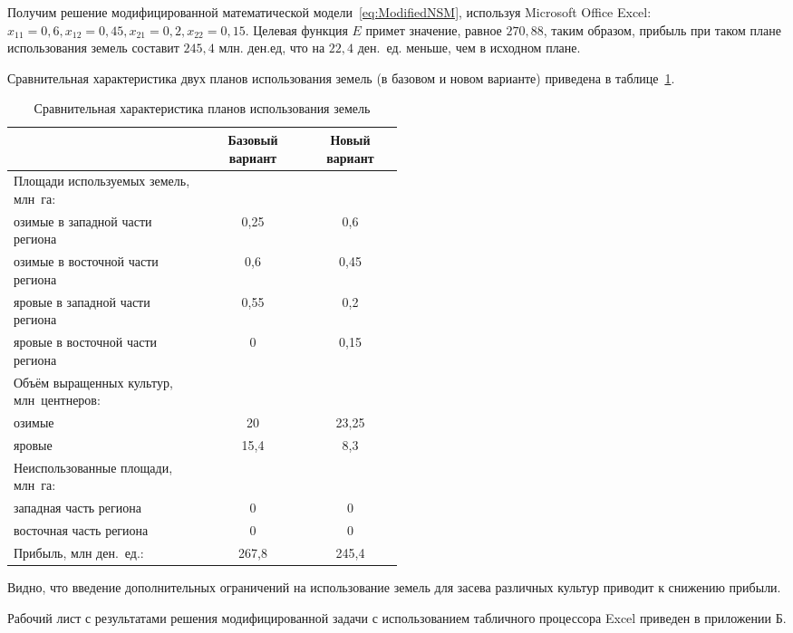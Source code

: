 Получим решение модифицированной математической модели~\eqref{eq:ModifiedNSM}, используя Microsoft Office Excel:
$ x_{11} = 0{,}6, x_{12} = 0{,}45, x_{21} = 0,2, x_{22} = 0{,}15 $. Целевая функция $ E $ примет значение,
равное $ 270{,}88 $, таким образом, прибыль при таком плане использования земель составит $ 245{,}4 $ млн. ден.ед,
что на $ 22{,}4 $ ден.~ед. меньше, чем в исходном плане.

Сравнительная характеристика двух планов использования земель (в базовом и новом варианте) приведена
в таблице~\ref{tbl:Comparation}.

\renewcommand{\tabcolsep}{0.3em}
\begin{table}[h!]
  \centering
    \caption{Сравнительная характеристика планов использования земель\label{tbl:Comparation}}
    \begin{tabular}{|p{0.5\linewidth}|c|c|}
      \hline
       & Базовый вариант & Новый вариант \\ \hline
      Площади используемых земель, млн~га: & & \\ 
      \hspace{2ex}озимые в западной части региона & 0{,}25  &  0{,}6  \\ 
      \hspace{2ex}озимые в восточной части региона &  0{,}6  &  0{,}45  \\ 
      \hspace{2ex}яровые в западной части региона &  0{,}55  &  0{,}2  \\ 
      \hspace{2ex}яровые в восточной части региона &  0  &  0{,}15  \\ \hline
      Объём выращенных культур, млн~центнеров: & & \\ 
      \hspace{2ex}озимые &  20  &  23{,}25  \\ 
      \hspace{2ex}яровые &  15{,}4  &  8{,}3  \\ \hline
      Неиспользованные площади, млн~га: & & \\
      \hspace{2ex}западная часть региона & 0 & 0 \\ 
      \hspace{2ex}восточная часть региона & 0 & 0 \\ \hline
      Прибыль, млн ден.~ед.: &  267{,}8  &  245{,}4  \\ \hline
    \end{tabular}
\end{table}

Видно, что введение дополнительных ограничений на использование земель для засева различных культур
приводит к снижению прибыли.

Рабочий лист с результатами решения модифицированной задачи с использованием
табличного процессора Excel приведен в приложении Б.

\newpage